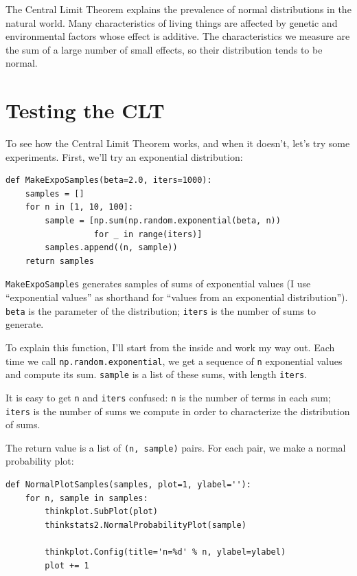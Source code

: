 \documentclass[12pt]{book}
\theoremstyle{exercise}
\begin{document}
The Central Limit Theorem explains the prevalence
of normal distributions in the natural world.  Many characteristics of
living things are affected by genetic
and environmental factors whose effect is additive.  The characteristics
we measure are the sum of a large number of small effects, so their
distribution tends to be normal.%
%
%
%
%
%


\section{Testing the CLT}

To see how the Central Limit Theorem works, and when it doesn't,
let's try some experiments.  First, we'll try
an exponential distribution:

\begin{verbatim}
def MakeExpoSamples(beta=2.0, iters=1000):
    samples = []
    for n in [1, 10, 100]:
        sample = [np.sum(np.random.exponential(beta, n))
                  for _ in range(iters)]
        samples.append((n, sample))
    return samples
\end{verbatim}

{\tt MakeExpoSamples} generates samples of sums of exponential values
(I use ``exponential values'' as shorthand for ``values from an
exponential distribution'').
{\tt beta} is the parameter of the distribution; {\tt iters}
is the number of sums to generate.

To explain this function, I'll start from the inside and work my way
out.  Each time we call {\tt np.random.exponential}, we get a sequence
of {\tt n} exponential values and compute its sum.  {\tt sample}
is a list of these sums, with length {\tt iters}.%

It is easy to get {\tt n} and {\tt iters} confused:  {\tt n} is the
number of terms in each sum;  {\tt iters} is the number of sums we
compute in order to characterize the distribution of sums.

The return value is a list of {\tt (n, sample)} pairs.  For
each pair, we make a normal probability plot:%
%

\begin{verbatim}
def NormalPlotSamples(samples, plot=1, ylabel=''):
    for n, sample in samples:
        thinkplot.SubPlot(plot)
        thinkstats2.NormalProbabilityPlot(sample)

        thinkplot.Config(title='n=%d' % n, ylabel=ylabel)
        plot += 1
\end{verbatim}
\end{document}
